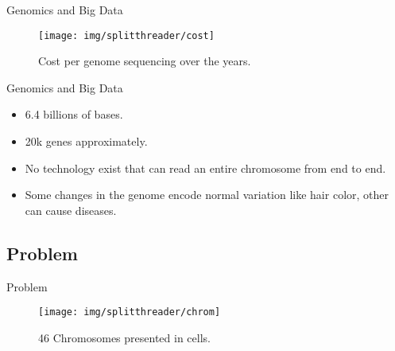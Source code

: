 \documentclass[10pt]{beamer}
\newcommand{\1}{
        	\setbeamertemplate{background}{
        		\texttt{[image: img/1\_BIO]}
        		\tikz[overlay] \fill[fill opacity=0.75,fill=white] (0,0) rectangle (-\paperwidth,\paperheight);
        	}
}
\begin{document}
\begin{frame}{Genomics and Big Data}{}	
	\begin{figure}
		\centering
		\texttt{[image: img/splitthreader/cost]}
		\caption{Cost per genome sequencing over the years.}
	\end{figure}		
\end{frame}

\begin{frame}{Genomics and Big Data}{}
	\begin{itemize}
		\item 6.4 billions of bases.
		\item 20k genes approximately.
		\item No technology exist that can read an entire chromosome from end to end.
		\item Some changes in the genome encode normal variation like hair color, other can cause diseases.
	\end{itemize}		
\end{frame}

\subsection{Problem}

\begin{frame}{Problem}{}
	\begin{figure}
		\centering
		\texttt{[image: img/splitthreader/chrom]}
		\caption{46 Chromosomes presented in cells.}
	\end{figure}		
\end{frame}
\end{document}
